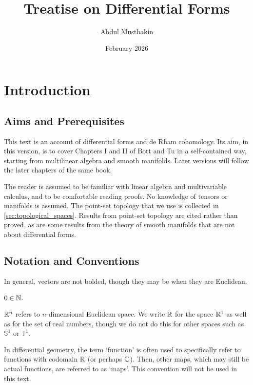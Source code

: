\documentclass[a4paper,12pt]{article}
\title{Treatise on Differential Forms}
\author{Abdul Musthakin}
\date{February 2026}
\begin{document}
\maketitle

\pagebreak

\tableofcontents

\pagebreak

\section{Introduction}\label{sec:introduction}

\subsection{Aims and Prerequisites}\label{subsec:introduction:aims_and_prerequisites}

This text is an account of differential forms and de Rham cohomology.
Its aim, in this version, is to cover Chapters I and II of Bott and Tu \cite{bott1982differential} in a self-contained way, starting from multilinear algebra and smooth manifolds.
Later versions will follow the later chapters of the same book.

The reader is assumed to be familiar with linear algebra and multivariable calculus, and to be comfortable reading proofs.
No knowledge of tensors or manifolds is assumed.
The point-set topology that we use is collected in \cref{sec:topological_spaces}.
Results from point-set topology are cited rather than proved, as are some results from the theory of smooth manifolds that are not about differential forms.

\subsection{Notation and Conventions}\label{subsec:introduction:notation_and_conventions}

In general, vectors are not bolded, though they may be when they are Euclidean.

$0 \in \mathbb{N}$.

$\mathbb{R}^n$ refers to $n$-dimensional Euclidean space.
We write $\mathbb{R}$ for the space $\mathbb{R}^1$ as well as for the set of real numbers, though we do not do this for other spaces such as $\mathbb{S}^1$ or $\mathbb{T}^1$.

In differential geometry, the term \enquote*{function} is often used to specifically refer to functions with codomain $\mathbb{R}$ (or perhaps $\mathbb{C}$).
Then, other maps, which may still be actual functions, are referred to as \enquote*{maps}.
This convention will not be used in this text.
\end{document}
